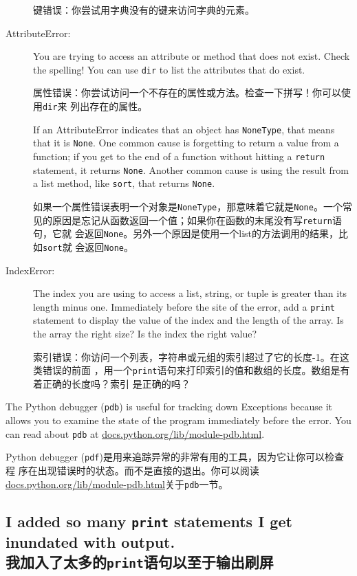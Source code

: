 \documentclass[10pt]{book}
\begin{document}
\begin{CJK}{UTF8}{gbsn}
\begin{description}
键错误：你尝试用字典没有的键来访问字典的元素。

\item[AttributeError:] You are trying to access an attribute or method
that does not exist.  Check the spelling!  You can use
{\tt dir} to list the attributes that do exist.

属性错误：你尝试访问一个不存在的属性或方法。检查一下拼写！你可以使用{\tt dir}来
列出存在的属性。

If an AttributeError indicates that an object has {\tt NoneType},
that means that it is {\tt None}.  One common cause is forgetting
to return a value from a function; if you get to the end of
a function without hitting a {\tt return} statement, it returns
{\tt None}.  Another common cause is using the result from
a list method, like {\tt sort}, that returns {\tt None}.

如果一个属性错误表明一个对象是{\tt NoneType}，那意味着它就是{\tt None}。一个常
见的原因是忘记从函数返回一个值；如果你在函数的末尾没有写{\tt return}语句，它就
会返回{\tt None}。另外一个原因是使用一个list的方法调用的结果，比如{\tt sort}就
会返回{\tt None}。

\item[IndexError:] The index you are using
to access a list, string, or tuple is greater than
its length minus one.  Immediately before the site of the error,
add a {\tt print} statement to display
the value of the index and the length of the array.
Is the array the right size?  Is the index the right value?

索引错误：你访问一个列表，字符串或元组的索引超过了它的长度-1。在这类错误的前面
，用一个{\tt print}语句来打印索引的值和数组的长度。数组是有着正确的长度吗？索引
是正确的吗？

\end{description}

The Python debugger ({\tt pdb}) is useful for tracking down
Exceptions because it allows you to examine the state of the
program immediately before the error.  You can read
about {\tt pdb} at \url{docs.python.org/lib/module-pdb.html}.

Python debugger ({\tt pdf})是用来追踪异常的非常有用的工具，因为它让你可以检查程
序在出现错误时的状态。而不是直接的退出。你可以阅读
\url{docs.python.org/lib/module-pdb.html}关于{\tt pdb}一节。

\subsection{I added so many {\tt print} statements I get inundated with
output.\\我加入了太多的{\tt print}语句以至于输出刷屏}


\end{CJK}
\end{document}
